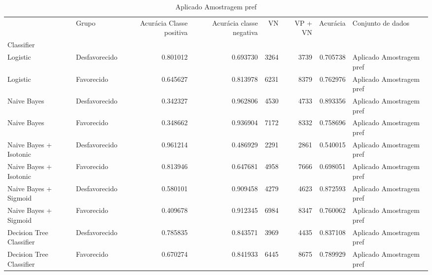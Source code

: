 \begin{table}
\centering
\caption{Aplicado Amostragem pref}
\label{Aplicado Amostragem pref 5}
\begin{tabular}{llrrrrrl}
\toprule
{} &          Grupo &  Acurácia Classe positiva &  Acurácia classe negativa &   VN  &  VP + VN  &  Acurácia &         Conjunto de dados \\
Classifier               &                &                           &                           &       &           &           &                           \\
\midrule
Logistic                 &  Desfavorecido &                  0.801012 &                  0.693730 &  3264 &      3739 &  0.705738 &  Aplicado Amostragem pref \\
Logistic                 &     Favorecido &                  0.645627 &                  0.813978 &  6231 &      8379 &  0.762976 &  Aplicado Amostragem pref \\
Naive Bayes              &  Desfavorecido &                  0.342327 &                  0.962806 &  4530 &      4733 &  0.893356 &  Aplicado Amostragem pref \\
Naive Bayes              &     Favorecido &                  0.348662 &                  0.936904 &  7172 &      8332 &  0.758696 &  Aplicado Amostragem pref \\
Naive Bayes + Isotonic   &  Desfavorecido &                  0.961214 &                  0.486929 &  2291 &      2861 &  0.540015 &  Aplicado Amostragem pref \\
Naive Bayes + Isotonic   &     Favorecido &                  0.813946 &                  0.647681 &  4958 &      7666 &  0.698051 &  Aplicado Amostragem pref \\
Naive Bayes + Sigmoid    &  Desfavorecido &                  0.580101 &                  0.909458 &  4279 &      4623 &  0.872593 &  Aplicado Amostragem pref \\
Naive Bayes + Sigmoid    &     Favorecido &                  0.409678 &                  0.912345 &  6984 &      8347 &  0.760062 &  Aplicado Amostragem pref \\
Decision Tree Classifier &  Desfavorecido &                  0.785835 &                  0.843571 &  3969 &      4435 &  0.837108 &  Aplicado Amostragem pref \\
Decision Tree Classifier &     Favorecido &                  0.670274 &                  0.841933 &  6445 &      8675 &  0.789929 &  Aplicado Amostragem pref \\
\bottomrule
\end{tabular}
\end{table}
